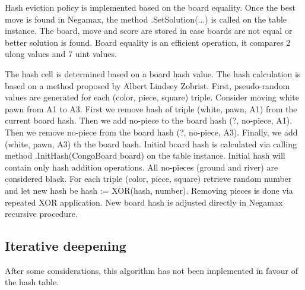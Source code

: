 \vspace{0.5em}

Hash eviction policy is implemented based on the board equality. Once the best
move is found in Negamax, the method \textsf{.SetSolution(...)} is called on
the table instance. The board, move and score are stored in case boards are
not equal or better solution is found. Board equality is an efficient
operation, it compares 2 \textsf{ulong} values and 7 \textsf{uint} values.

\vspace{0.5em}

The hash cell is determined based on a board hash value. The hash calculation
is based on a method proposed by Albert Lindsey Zobrist. First, pseudo-random
values are generated for each (color, piece, square) triple. Consider moving
white pawn from \textsf{A1} to \textsf{A3}. First we remove hash of triple
(white, pawn, A1) from the current board hash. Then we add no-piece to the
board hash (?, no-piece, A1). Then we remove no-piece from the board hash (?,
no-piece, A3). Finally, we add (white, pawn, A3) th the board hash. Initial
board hash is calculated via calling method \textsf{.InitHash(CongoBoard
board)} on the table instance. Initial hash will contain only hash addition
operations. All no-pieces (ground and river) are considered black. For each
triple (color, piece, square) retrieve random number and let new hash be
\textsf{hash := XOR(hash, number)}. Removing pieces is done via repeated
\textsf{XOR} application. New board hash is adjusted directly in Negamax
recursive procedure.

\subsection{Iterative deepening}

\vspace{0.5em}

After some considerations, this algorithm has not been implemented in favour
of the hash table.

